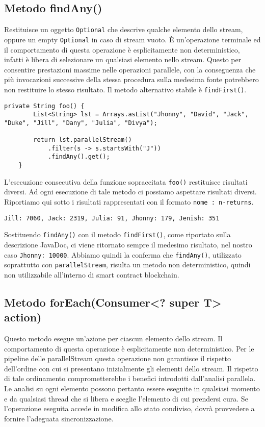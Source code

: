 		\subsection{Metodo findAny()}
			Restituisce un oggetto \lstinline|Optional| che descrive qualche elemento dello stream, oppure un empty \lstinline|Optional| in caso di stream vuoto. \`E un'operazione terminale ed il comportamento di questa operazione è esplicitamente non deterministico, infatti è libera di selezionare un qualsiasi elemento nello stream. Questo per consentire prestazioni massime nelle operazioni parallele, con la conseguenza che più invocazioni successive della stessa procedura sulla medesima fonte potrebbero non restituire lo stesso risultato. Il metodo alternativo stabile è \lstinline|findFirst()|.
			\begin{lstlisting}[breaklines=true]
	private String foo() {
		List<String> lst = Arrays.asList("Jhonny", "David", "Jack", "Duke", "Jill", "Dany", "Julia", "Divya");
		
		return lst.parallelStream()
			.filter(s -> s.startsWith("J"))
			.findAny().get();
	}
			\end{lstlisting}
			L'esecuzione consecutiva della funzione sopraccitata \lstinline|foo()| restituisce risultati diversi. Ad ogni esecuzione di tale metodo ci possiamo aspettare risultati diversi. Riportiamo qui sotto i risultati rappresentati con il formato \lstinline|nome : n-returns|.
			\begin{lstlisting}[numbers=none,frame=none]
	Jill: 7060, Jack: 2319, Julia: 91, Jhonny: 179, Jenish: 351
			\end{lstlisting}
			Sostituendo \lstinline|findAny()| con il metodo \lstinline|findFirst()|, come riportato sulla descrizione JavaDoc, ci viene ritornato sempre il medesimo risultato, nel nostro caso \lstinline|Jhonny: 10000|.
			Abbiamo quindi la conferma che \lstinline|findAny()|, utilizzato soprattutto con \lstinline|parallelStream|, risulta un metodo non deterministico, quindi non utilizzabile all'interno di smart contract blockchain.
			
		\subsection{Metodo forEach(Consumer<? super T> action)}
		\label{subsection-forEach}
			Questo metodo esegue un'azione per ciascun elemento dello stream. Il comportamento di questa operazione è esplicitamente non deterministico.
			Per le pipeline delle parallelStream  questa operazione non garantisce il rispetto dell'ordine con cui si presentano inizialmente gli elementi dello stream. Il rispetto di tale ordinamento comprometterebbe i benefici introdotti dall'analisi parallela. Le analisi su ogni elemento possono pertanto essere eseguite in qualsiasi momento e da qualsiasi thread che si libera e sceglie l'elemento di cui prendersi cura. Se l'operazione eseguita accede in modifica allo stato condiviso, dovrà provvedere a fornire l'adeguata sincronizzazione. 
			
